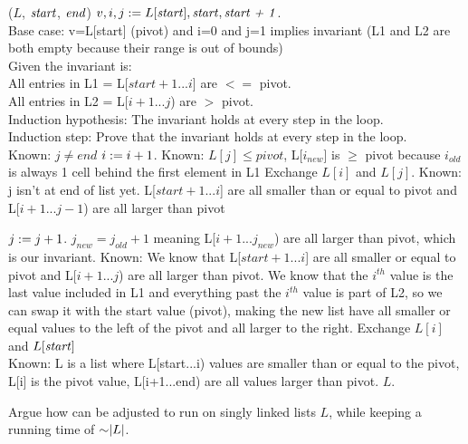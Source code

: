 \begin{problem}
\begin{questions}
\begin{myalgo}{($L$, $\textit{start\/}$, $\textit{end\/}$)}
    \STATE $v, i, j := L[\textit{start\/}], \textit{start\/}, \textit{start + 1\/}$.\\
    Base case: v=L[start] (pivot) and i=0 and j=1 implies invariant (L1 and L2 are both empty because their range is out of bounds) \\
    Given the invariant is: \\
    All entries in L1 = L[$start+1$...$i$] are $<=$ pivot.\\
    All entries in L2 = L[$i + 1$...$j$) are $>$ pivot.\\
    Induction hypothesis: The invariant holds at every step in the loop.\\
    Induction step: Prove that the invariant holds at every step in the loop.\\
    \label{alg:while}
    \STATE Known: $j \neq end$
            \STATE $i := i + 1$.
            \STATE Known: $L[j] \leq pivot$, L[$i_{new}$] is $\geq$ pivot because $i_{old}$ is always 1 cell behind the first element in L1
            \STATE Exchange $L[i]$ and $L[j]$.
            \STATE Known: j isn't at end of list yet. L[$start+1$...$i$] are all smaller than or equal to pivot and L[$i + 1$...$j-1$) are all larger than pivot 
    
        \ENDIF
        \STATE $j := j + 1$.
        \STATE $j_{new} = j_{old} + 1$ meaning L[$i + 1$...$j_{new}$) are all larger than pivot, which is our invariant.
    \ENDWHILE
    \STATE Known: We know that L[$start+1$...$i$] are all smaller or equal to pivot and L[$i + 1$...$j$) are all larger than pivot. We know that the $i^{th}$ value is the last value included in L1 and everything past the $i^{th}$ value is part of L2, so we can swap it with the start value (pivot), making the new list have all smaller or equal values to the left of the pivot and all larger to the right.
    \STATE Exchange $L[i]$ and $L[\textit{start\/}]$
    \\Known: L is a list where L[start...i) values are smaller than or equal to the pivot, L[i] is the pivot value, L[i+1...end) are all values larger than pivot.
    \RETURN $L$.
\end{myalgo}

    \item Argue how  can be adjusted to run on singly linked lists $L$, while keeping a running time of $\mathord{\sim}\lvert L \rvert$.
\end{questions}
\end{problem}

